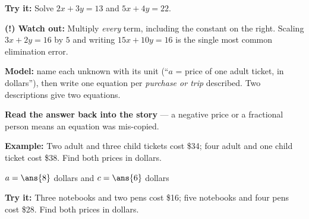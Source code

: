 \documentclass[12pt]{article}
\begin{document}
\begin{tryitbox}
\textbf{Try it:} \quad Solve $2x + 3y = 13$ and $5x + 4y = 22$.\\[2pt]
\end{tryitbox}

\begin{watchoutbox}
\textbf{(!) Watch out:} Multiply \emph{every} term, including the constant on the right. Scaling $3x + 2y = 16$ by $5$ and writing $15x + 10y = 16$ is the single most common elimination error.
\end{watchoutbox}


\begin{formulabox}
\textbf{Model:} name each unknown with its unit (``$a$ = price of one adult ticket, in dollars''), then write one equation per \emph{purchase or trip} described. Two descriptions give two equations.\par
\textbf{Read the answer back into the story} --- a negative price or a fractional person means an equation was mis-copied.
\end{formulabox}

\begin{examplebox}
\textbf{Example:} \quad Two adult and three child tickets cost \$34; four adult and one child ticket cost \$38. Find both prices in dollars.

$a = \ans{8}$ dollars \quad and \quad $c = \ans{6}$ dollars
\end{examplebox}

\begin{tryitbox}
\textbf{Try it:} \quad Three notebooks and two pens cost \$16; five notebooks and four pens cost \$28. Find both prices in dollars.\\[2pt]
\end{tryitbox}
\end{document}
